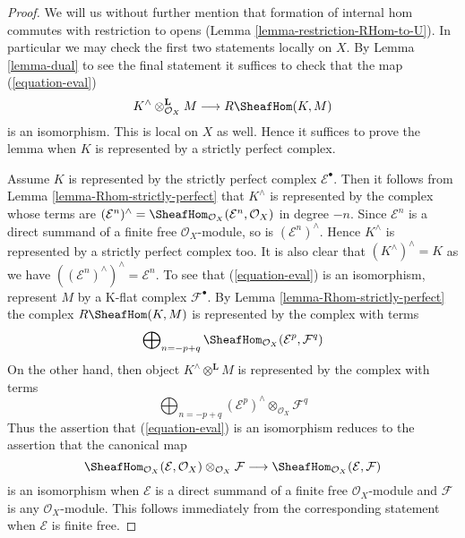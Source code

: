 \begin{proof}
We will us without further mention that formation of internal hom commutes
with restriction to opens (Lemma \ref{lemma-restriction-RHom-to-U}).
In particular we may check the first two statements locally on $X$.
By Lemma \ref{lemma-dual} to see the final statement it suffices to check
that the map (\ref{equation-eval})
$$
K^\wedge \otimes^\mathbf{L}_{\mathcal{O}_X} M
\longrightarrow
R\SheafHom(K, M)
$$
is an isomorphism. This is local on $X$ as well.
Hence it suffices to prove the lemma when $K$ is represented
by a strictly perfect complex.

\medskip\noindent
Assume $K$ is represented by the strictly perfect complex
$\mathcal{E}^\bullet$. Then it follows from
Lemma \ref{lemma-Rhom-strictly-perfect}
that $K^\wedge$ is represented by the complex whose terms are
$(\mathcal{E}^n)^\wedge =
\SheafHom_{\mathcal{O}_X}(\mathcal{E}^n, \mathcal{O}_X)$
in degree $-n$. Since $\mathcal{E}^n$ is a direct summand of a finite
free $\mathcal{O}_X$-module, so is $(\mathcal{E}^n)^\wedge$.
Hence $K^\wedge$ is represented by a strictly perfect complex too.
It is also clear that $(K^\wedge)^\wedge = K$ as we have
$((\mathcal{E}^n)^\wedge)^\wedge = \mathcal{E}^n$.
To see that (\ref{equation-eval}) is an isomorphism, represent
$M$ by a K-flat complex $\mathcal{F}^\bullet$.
By Lemma \ref{lemma-Rhom-strictly-perfect} the complex
$R\SheafHom(K, M)$ is represented by the complex with terms
$$
\bigoplus\nolimits_{n = -p + q}
\SheafHom_{\mathcal{O}_X}(\mathcal{E}^p, \mathcal{F}^q)
$$
On the other hand, then object $K^\wedge \otimes^\mathbf{L} M$
is represented by the complex with terms
$$
\bigoplus\nolimits_{n = -p + q}
(\mathcal{E}^p)^\wedge \otimes_{\mathcal{O}_X} \mathcal{F}^q
$$
Thus the assertion that (\ref{equation-eval}) is an isomorphism
reduces to the assertion that the canonical map
$$
\SheafHom_{\mathcal{O}_X}(\mathcal{E}, \mathcal{O}_X)
\otimes_{\mathcal{O}_X} \mathcal{F}
\longrightarrow
\SheafHom_{\mathcal{O}_X}(\mathcal{E}, \mathcal{F})
$$
is an isomorphism when $\mathcal{E}$ is a direct summand of a finite
free $\mathcal{O}_X$-module and $\mathcal{F}$ is any $\mathcal{O}_X$-module.
This follows immediately from the corresponding statement when
$\mathcal{E}$ is finite free.
\end{proof}












